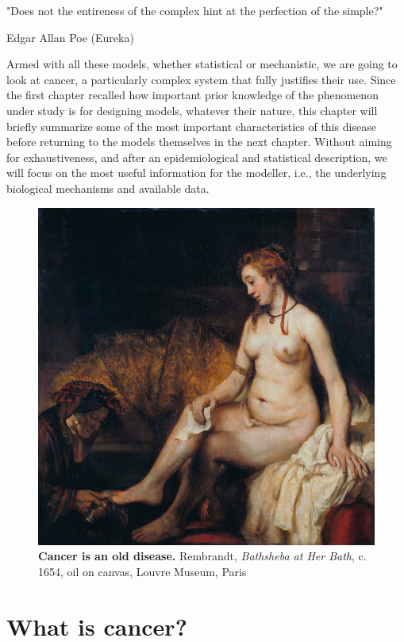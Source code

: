 \documentclass[a4paper,12pt,twoside,onecolumn,openright,final,oldfontcommands]{memoir}
\newcommand{\initial}[1]{
	\lettrine[lines=3,lhang=0.33,nindent=0em]{
		\color{gray}
     		{\textsc{#1}}}{}}
\begin{document}
\epigraph{"Does not the entireness of the complex hint at the perfection of the simple?"}{Edgar Allan Poe (Eureka)}

\initial{A}rmed with all these models, whether statistical or
mechanistic, we are going to look at cancer, a particularly complex
system that fully justifies their use. Since the first chapter recalled
how important prior knowledge of the phenomenon under study is for
designing models, whatever their nature, this chapter will briefly
summarize some of the most important characteristics of this disease
before returning to the models themselves in the next chapter. Without
aiming for exhaustiveness, and after an epidemiological and statistical
description, we will focus on the most useful information for the
modeller, i.e., the underlying biological mechanisms and available data.

\begin{figure}

{\centering \includegraphics[width=0.9\linewidth]{fig/bath} 

}

\caption[Cancer is an old disease]{\textbf{Cancer is an old disease.} Rembrandt,
\emph{Bathsheba at Her Bath}, c. 1654, oil on canvas, Louvre Museum,
Paris}\label{fig:bath}
\end{figure}





\section{What is cancer?}\label{what-is-cancer}
\end{document}
